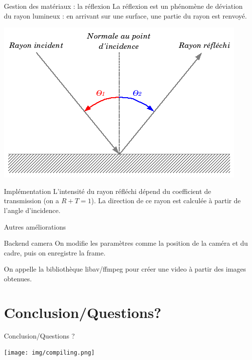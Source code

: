 \documentclass{beamer}
\begin{document}
\begin{frame}{Gestion des matériaux : la réflexion}
La réflexion est un phénomène de déviation du rayon lumineux : en arrivant sur
une surface, une partie du rayon est renvoyé.

\begin{center}
  \includegraphics[scale=0.4]{img/introduction.png}
\end{center}

\begin{block}{Implémentation}
L'intensité du rayon réfléchi dépend du coefficient de transmission (on a
$R+T=1$). La direction de ce rayon est calculée à partir de l'angle d'incidence.
\end{block}
\end{frame}

\begin{frame}{Autres améliorations}
\begin{block}{Backend camera}
On modifie les paramètres comme la position de la caméra et du cadre, puis on enregistre la frame.

On appelle la bibliothèque libav/ffmpeg pour créer une video à partir des images obtenues.
\end{block}
\end{frame}

\section{Conclusion/Questions?}
\begin{frame}{Conclusion/Questions ?}

\begin{center}
  \texttt{[image: img/compiling.png]}
\end{center}

\end{frame}
\end{document}
